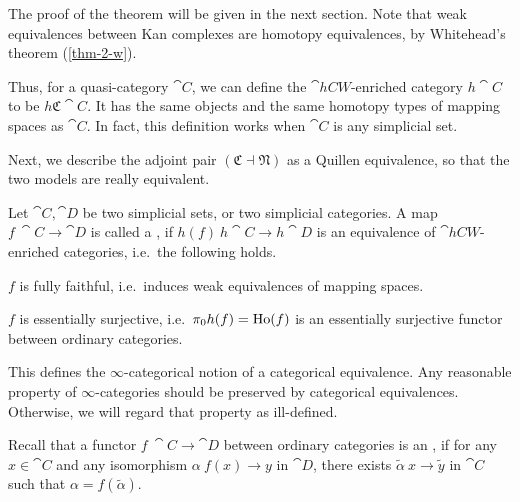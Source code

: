 The proof of the theorem will be given in the next section.
Note that weak equivalences between Kan complexes
are homotopy equivalences,
by Whitehead's theorem (\ref{thm-2-w}).

Thus, for a quasi-category $\cat C$, we can define the 
$\cat{hCW}$-enriched category $h\cat C$ to be $h\mathfrak C\cat C$.
It has the same objects and the same homotopy types of mapping spaces as $\cat C$.
In fact, this definition works when $\cat C$ is any simplicial set.

Next, we describe the adjoint pair $(\mathfrak C\dashv\mathfrak N)$
as a Quillen equivalence,
so that the two models are really equivalent.

\begin{definition}
    Let $\cat C,\cat D$ be two simplicial sets, or two simplicial categories.
    A map $f\:\cat C\to\cat D$ is called a ,
    if $h(f)\:h\cat C\to h\cat D$
    is an equivalence of $\cat{hCW}$-enriched categories, i.e.\ the following holds.
    \begin{itms}
        \item $f$ is fully faithful, i.e.\ induces weak equivalences of mapping spaces.
        \item $f$ is essentially surjective, i.e.\ $\pi_0h(f)=\operatorname{Ho}(f)$
        is an essentially surjective functor between ordinary categories.
    \end{itms}
\end{definition}

\begin{remark}
    This defines the $\infty$-categorical notion
    of a categorical equivalence.
    Any reasonable property of $\infty$-categories
    should be preserved by categorical equivalences.
    Otherwise, we will regard that property as ill-defined.
    \varqed
\end{remark}

Recall that a functor $f\:\cat C\to\cat D$ between ordinary categories is an ,
if for any $x\in\cat C$ and any isomorphism $\alpha\:f(x)\to y$ in $\cat D$,
there exists $\tilde\alpha\:x\to\tilde y$ in $\cat C$ such that $\alpha=f(\tilde\alpha)$.

